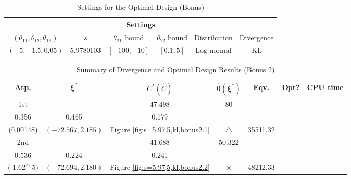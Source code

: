 \documentclass[12pt, a4paper]{article}
\begin{document}


\begin{table}[H]
\centering
\renewcommand{\arraystretch}{1.5} %
\setlength{\tabcolsep}{12pt} %
\begin{tabular}{|c|c|c|c|c|c|}
\hline
\multicolumn{6}{|c|}{\textbf{Settings}} \\ 
\hline
\((\theta_{11}, \theta_{12}, \theta_{13})\) & \(s\) & \(\theta_{21} \text{ bound}\) & \(\theta_{22} \text{ bound}\) & \(\text{Distribution}\) & Divergence \\
\hline
\((-5, -1.5, 0.05)\) & \(5.9780103\) & \([-100, -10]\) & \([0.1, 5]\) & \(\text{Log-normal}\) & KL\\
\hline
\end{tabular}
\caption{Settings for the Optimal Design (Bonus)}
\label{tab:Bonus2}
\end{table}

\begin{table}[H]
\centering
\renewcommand{\arraystretch}{1.5} %
\setlength{\tabcolsep}{8pt} %
\begin{tabular}{|c|c|c|c|c|c|c|}
\hline
\textbf{Atp.} & \(\boldsymbol{\xi^*}\) & \(C^* (\hat{C})\) & \(\boldsymbol{\hat{\theta}(\xi^*)}\) & \textbf{Eqv.} & \textbf{Opt?} & \textbf{CPU time} \\
\hline
1st & \(\left\{\begin{array}{ccc}
10 & 47.498 & 80 \\
0.356 & 0.465 & 0.179
\end{array}\right\}\) &
\(\begin{array}{c}
0.00979 \\
(0.00148)
\end{array}\) & 
\((-72.567, 2.185)\) & 
Figure \ref{fig:s=5.97,5,kl,bonus2.1} & $\triangle$ & 35511.32 \\
\hline
2nd & \(\left\{\begin{array}{ccc}
35.628 & 41.688 & 50.322 \\
0.536 & 0.224 & 0.241
\end{array}\right\}\) &
\(\begin{array}{c}
0.0170 \\
(-1.62\times 10^{-5})
\end{array}\) & 
\((-72.694, 2.180)\) & 
Figure \ref{fig:s=5.97,5,kl,bonus2.2} & $\times$ & 48212.33 \\
\hline
\end{tabular}
\caption{Summary of Divergence and Optimal Design Results (Bonus 2)}
\label{tab:bonus_results2}
\end{table}
\end{document}
